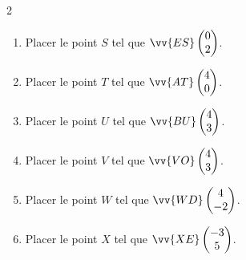 \begin{exercise}
\begin{enumerate}[leftmargin=*, label=\arabic*)]
\begin{multicols}{2}
			\begin{enumerate}[leftmargin=*, label=\alph*)]
				\item   Placer le point $S$ tel que $\vv{ES}\begin{pmatrix}
					0\\2
				\end{pmatrix}$.
				\item   Placer le point $T$ tel que $\vv{AT}\begin{pmatrix}
					4\\0
				\end{pmatrix}$.
				\item   Placer le point $U$ tel que $\vv{BU}\begin{pmatrix}
					4\\3
				\end{pmatrix}$.
				\item   Placer le point $V$ tel que $\vv{VO}\begin{pmatrix}
					4\\3
				\end{pmatrix}$.
				\item   Placer le point $W$ tel que $\vv{WD}\begin{pmatrix}
					4\\-2
				\end{pmatrix}$.
				\item   Placer le point $X$ tel que $\vv{XE}\begin{pmatrix}
					-3\\5
				\end{pmatrix}$.
			\end{enumerate}  
		\end{multicols}
	\end{enumerate} 
\end{exercise} 

